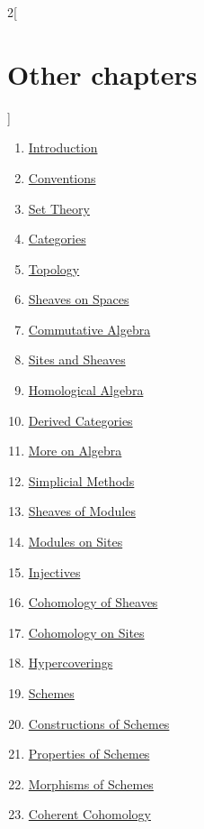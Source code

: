 \begin{multicols}{2}[\section{Other chapters}]
\begin{enumerate}
\item \hyperref[introduction-section-phantom]{Introduction}
\item \hyperref[conventions-section-phantom]{Conventions}
\item \hyperref[sets-section-phantom]{Set Theory}
\item \hyperref[categories-section-phantom]{Categories}
\item \hyperref[topology-section-phantom]{Topology}
\item \hyperref[sheaves-section-phantom]{Sheaves on Spaces}
\item \hyperref[algebra-section-phantom]{Commutative Algebra}
\item \hyperref[sites-section-phantom]{Sites and Sheaves}
\item \hyperref[homology-section-phantom]{Homological Algebra}
\item \hyperref[derived-section-phantom]{Derived Categories}
\item \hyperref[more-algebra-section-phantom]{More on Algebra}
\item \hyperref[simplicial-section-phantom]{Simplicial Methods}
\item \hyperref[modules-section-phantom]{Sheaves of Modules}
\item \hyperref[sites-modules-section-phantom]{Modules on Sites}
\item \hyperref[injectives-section-phantom]{Injectives}
\item \hyperref[cohomology-section-phantom]{Cohomology of Sheaves}
\item \hyperref[sites-cohomology-section-phantom]{Cohomology on Sites}
\item \hyperref[hypercovering-section-phantom]{Hypercoverings}
\item \hyperref[schemes-section-phantom]{Schemes}
\item \hyperref[constructions-section-phantom]{Constructions of Schemes}
\item \hyperref[properties-section-phantom]{Properties of Schemes}
\item \hyperref[morphisms-section-phantom]{Morphisms of Schemes}
\item \hyperref[coherent-section-phantom]{Coherent Cohomology}

\end{enumerate}
\end{multicols}
